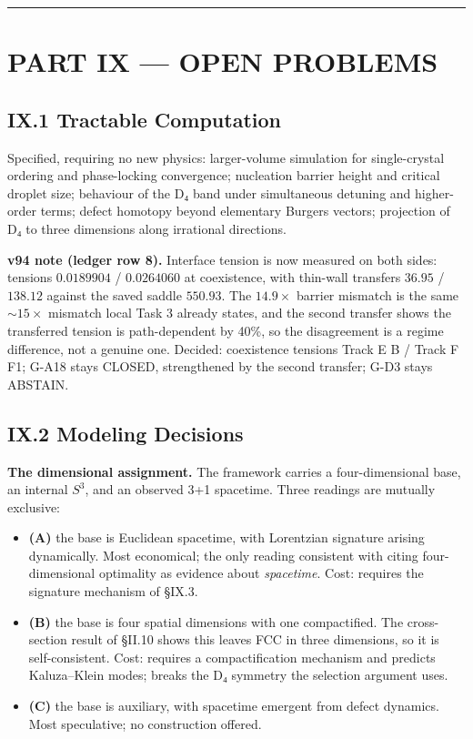 \documentclass[a4paper,11pt]{article}
\begin{document}
\medskip\hrule\medskip

\section*{PART IX — OPEN PROBLEMS}

\subsection*{IX.1 Tractable Computation}

Specified, requiring no new physics: larger-volume simulation for single-crystal ordering and phase-locking convergence; nucleation barrier height and critical droplet size; behaviour of the D₄ band under simultaneous detuning and higher-order terms; defect homotopy beyond elementary Burgers vectors; projection of D₄ to three dimensions along irrational directions.

\textbf{v94 note (ledger row 8).} Interface tension is now measured on both sides: tensions $0.0189904$ / $0.0264060$ at coexistence, with thin-wall transfers $36.95$ / $138.12$ against the saved saddle $550.93$. The $14.9\times$ barrier mismatch is the same $\sim15\times$ mismatch local Task 3 already states, and the second transfer shows the transferred tension is path-dependent by 40\%, so the disagreement is a regime difference, not a genuine one. Decided: coexistence tensions Track E B / Track F F1; G-A18 stays CLOSED, strengthened by the second transfer; G-D3 stays ABSTAIN.

\subsection*{IX.2 Modeling Decisions}

\textbf{The dimensional assignment.} The framework carries a four-dimensional base, an internal $S^3$, and an observed 3+1 spacetime. Three readings are mutually exclusive:

\begin{itemize}
\item \textbf{(A)} the base is Euclidean spacetime, with Lorentzian signature arising dynamically. Most economical; the only reading consistent with citing four-dimensional optimality as evidence about \textit{spacetime}. Cost: requires the signature mechanism of §IX.3.
\item \textbf{(B)} the base is four spatial dimensions with one compactified. The cross-section result of §II.10 shows this leaves FCC in three dimensions, so it is self-consistent. Cost: requires a compactification mechanism and predicts Kaluza–Klein modes; breaks the D₄ symmetry the selection argument uses.
\item \textbf{(C)} the base is auxiliary, with spacetime emergent from defect dynamics. Most speculative; no construction offered.
\end{itemize}
\end{document}

